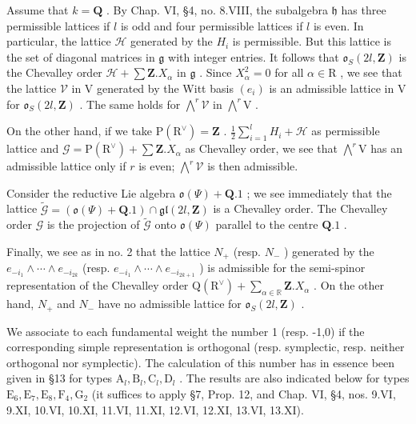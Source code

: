 Assume that \(k = \mathbf{Q}\) . By Chap. VI, §4, no. 8.VIII, the subalgebra \(\mathfrak{h}\) has three permissible lattices if \(l\) is odd and four permissible lattices if \(l\) is even. In particular, the lattice \(\mathcal{H}\) generated by the \(H_i\) is permissible. But this lattice is the set of diagonal matrices in \(\mathfrak{g}\) with integer entries. It follows that \(\mathfrak{o}_S(2l,\mathbf{Z})\) is the Chevalley order \(\mathcal{H} + \sum \mathbf{Z}.X_\alpha\) in \(\mathfrak{g}\) . Since \(X_{\alpha}^{2} = 0\) for all \(\alpha \in \mathrm{R}\) , we see that the lattice \(\mathcal{V}\) in \(\mathrm{V}\) generated by the Witt basis \((e_i)\) is an admissible lattice in \(\mathrm{V}\) for \(\mathfrak{o}_S(2l,\mathbf{Z})\) . The same holds for \(\bigwedge^r\mathcal{V}\) in \(\bigwedge^r\mathrm{V}\) .

On the other hand, if we take \(\mathrm{P}(\mathrm{R}^{\vee}) = \mathbf{Z}\) . \(\frac{1}{2} \sum_{i=1}^{l} H_i + \mathcal{H}\) as permissible lattice and \(\mathcal{G} = \mathrm{P}(\mathrm{R}^{\vee}) + \sum \mathbf{Z}. X_{\alpha}\) as Chevalley order, we see that \(\bigwedge^r \mathrm{V}\) has an admissible lattice only if \(r\) is even; \(\bigwedge^r \mathcal{V}\) is then admissible.

Consider the reductive Lie algebra \(\mathfrak{o}(\varPsi) + \mathbf{Q}.1\) ; we see immediately that the lattice \(\tilde{\mathcal{G}} = (\mathfrak{o}(\varPsi) + \mathbf{Q}.1) \cap \mathfrak{gl}(2l, \mathbf{Z})\) is a Chevalley order. The Chevalley order \(\mathcal{G}\) is the projection of \(\tilde{\mathcal{G}}\) onto \(\mathfrak{o}(\varPsi)\) parallel to the centre \(\mathbf{Q}.1\) .

Finally, we see as in no. 2 that the lattice \(N_{+}\) (resp. \(N_{-}\) ) generated by the \(e_{-i_{1}}\wedge\cdots\wedge e_{-i_{2k}}\) (resp. \(e_{-i_{1}}\wedge\cdots\wedge e_{-i_{2k+1}}\) ) is admissible for the semi-spinor representation of the Chevalley order \(\mathrm{Q}(\mathrm{R}^{\vee})+\sum_{\alpha\in\mathbb{R}}\mathbf{Z}.X_{\alpha}\) . On the other hand, \(N_{+}\) and \(N_{-}\) have no admissible lattice for \(\mathfrak{o}_{S}(2l,\mathbf{Z})\) .


We associate to each fundamental weight the number 1 (resp. -1,0) if the corresponding simple representation is orthogonal (resp. symplectic, resp. neither orthogonal nor symplectic). The calculation of this number has in essence been given in §13 for types \(\mathrm{A}_l, \mathrm{B}_l, \mathrm{C}_l, \mathrm{D}_l\) . The results are also indicated below for types \(\mathrm{E}_6, \mathrm{E}_7, \mathrm{E}_8, \mathrm{F}_4, \mathrm{G}_2\) (it suffices to apply §7, Prop. 12, and Chap. VI, §4, nos. 9.VI, 9.XI, 10.VI, 10.XI, 11.VI, 11.XI, 12.VI, 12.XI, 13.VI, 13.XI).

